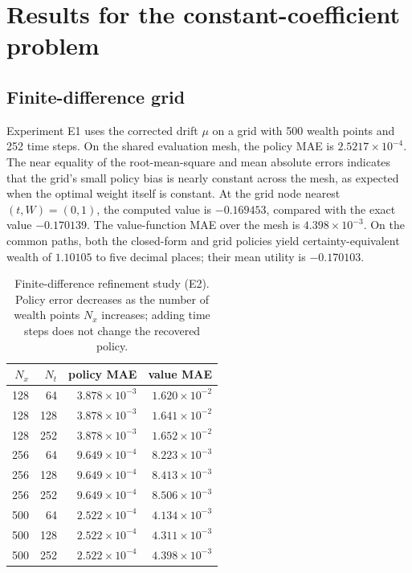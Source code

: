 \documentclass[11pt,a4paper]{article}
\begin{document}
\section{Results for the constant-coefficient problem}
\label{sec:results1d}

\subsection{Finite-difference grid}

Experiment E1 uses the corrected drift $\mu$ on a grid with 500 wealth points and 252 time steps. On the shared evaluation mesh, the policy MAE is $2.5217\times 10^{-4}$. The near equality of the root-mean-square and mean absolute errors indicates that the grid's small policy bias is nearly constant across the mesh, as expected when the optimal weight itself is constant. At the grid node nearest $(t,W)=(0,1)$, the computed value is $-0.169453$, compared with the exact value $-0.170139$. The value-function MAE over the mesh is $4.398\times 10^{-3}$. On the common paths, both the closed-form and grid policies yield certainty-equivalent wealth of $1.10105$ to five decimal places; their mean utility is $-0.170103$.

\begin{table}[H]
\centering
\caption{Finite-difference refinement study (E2). Policy error decreases as the number of wealth points $N_x$ increases; adding time steps does not change the recovered policy.}
\label{tab:fdm}
\begin{tabular}{rrrr}
\toprule
$N_x$ & $N_t$ & policy MAE & value MAE \\
\midrule
128 & 64  & $3.878\times 10^{-3}$ & $1.620\times 10^{-2}$ \\
128 & 128 & $3.878\times 10^{-3}$ & $1.641\times 10^{-2}$ \\
128 & 252 & $3.878\times 10^{-3}$ & $1.652\times 10^{-2}$ \\
256 & 64  & $9.649\times 10^{-4}$ & $8.223\times 10^{-3}$ \\
256 & 128 & $9.649\times 10^{-4}$ & $8.413\times 10^{-3}$ \\
256 & 252 & $9.649\times 10^{-4}$ & $8.506\times 10^{-3}$ \\
500 & 64  & $2.522\times 10^{-4}$ & $4.134\times 10^{-3}$ \\
500 & 128 & $2.522\times 10^{-4}$ & $4.311\times 10^{-3}$ \\
500 & 252 & $2.522\times 10^{-4}$ & $4.398\times 10^{-3}$ \\
\bottomrule
\end{tabular}
\end{table}
\end{document}

